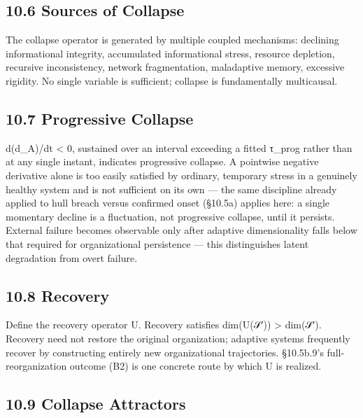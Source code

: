 \documentclass[
]{article}
\begin{document}
\hypertarget{sources-of-collapse}{%
\subsection{10.6 Sources of Collapse}\label{sources-of-collapse}}

The collapse operator is generated by multiple coupled mechanisms:
declining informational integrity, accumulated informational stress,
resource depletion, recursive inconsistency, network fragmentation,
maladaptive memory, excessive rigidity. No single variable is
sufficient; collapse is fundamentally multicausal.

\hypertarget{progressive-collapse}{%
\subsection{10.7 Progressive Collapse}\label{progressive-collapse}}

d(d\_A)/dt \textless{} 0, sustained over an interval exceeding a fitted
τ\_prog rather than at any single instant, indicates progressive
collapse. A pointwise negative derivative alone is too easily satisfied
by ordinary, temporary stress in a genuinely healthy system and is not
sufficient on its own --- the same discipline already applied to hull
breach versus confirmed onset (§10.5a) applies here: a single momentary
decline is a fluctuation, not progressive collapse, until it persists.
External failure becomes observable only after adaptive dimensionality
falls below that required for organizational persistence --- this
distinguishes latent degradation from overt failure.

\hypertarget{recovery}{%
\subsection{10.8 Recovery}\label{recovery}}

Define the recovery operator U. Recovery satisfies dim(U(𝒮′))
\textgreater{} dim(𝒮′). Recovery need not restore the original
organization; adaptive systems frequently recover by constructing
entirely new organizational trajectories. §10.5b.9's full-reorganization
outcome (B2) is one concrete route by which U is realized.

\hypertarget{collapse-attractors}{%
\subsection{10.9 Collapse Attractors}\label{collapse-attractors}}
\end{document}
